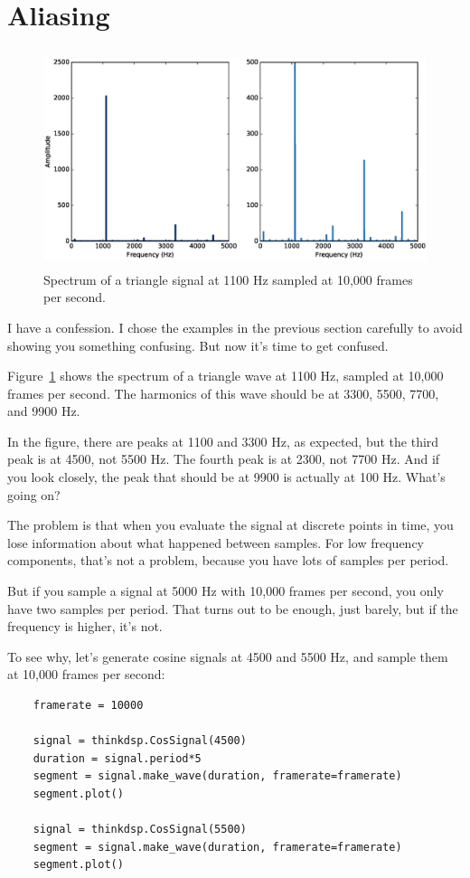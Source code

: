 \documentclass[12pt]{book}
\begin{document}
\section{Aliasing}
\label{aliasing}

\begin{figure}
\centerline{\includegraphics[height=2.5in]{figs/triangle-1100-2.eps}}
\caption{Spectrum of a triangle signal at 1100 Hz sampled at
10,000 frames per second.}
\label{fig.triangle.1100.2}
\end{figure}

I have a confession.  I chose the examples in the previous section
carefully to avoid showing you something confusing.  But now it's
time to get confused.

Figure~\ref{fig.triangle.1100.2} shows the spectrum of a triangle wave
at 1100 Hz, sampled at 10,000 frames per second.  The harmonics
of this wave should be at 3300, 5500, 7700, and 9900 Hz.

In the figure, there are peaks at 1100 and 3300 Hz, as expected, but
the third peak is at 4500, not 5500 Hz.  The
fourth peak is at 2300, not 7700 Hz.  And if you look closely, the
peak that should be at 9900 is actually at 100 Hz.  What's going on?

The problem is that when you evaluate the signal at
discrete points in time, you lose information about what happened
between samples.  For low frequency components, that's not a
problem, because you have lots of samples per period.

But if you sample a signal at 5000 Hz with 10,000 frames per second,
you only have two samples per period.  That turns out to be enough,
just barely, but if the frequency is higher, it's not.

To see why, let's generate cosine signals at 4500 and 5500 Hz,
and sample them at 10,000 frames per second:

\begin{verbatim}
    framerate = 10000

    signal = thinkdsp.CosSignal(4500)
    duration = signal.period*5
    segment = signal.make_wave(duration, framerate=framerate)
    segment.plot()

    signal = thinkdsp.CosSignal(5500)
    segment = signal.make_wave(duration, framerate=framerate)
    segment.plot()
\end{verbatim}
\end{document}

